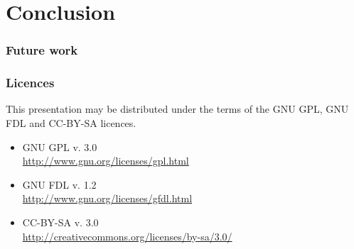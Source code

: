 \documentclass[notes=hide]{beamer}
\begin{document}
\section{Conclusion}
\begin{frame}\frametitle{Future work}
\end{frame}

\begin{frame}\frametitle{Licences}
  This presentation may be distributed under the terms of the
  GNU GPL, GNU FDL and CC-BY-SA licences.
  \begin{itemize}
  \item GNU GPL v. 3.0 \\
    \href{http://www.gnu.org/licenses/gpl.html}{http://www.gnu.org/licenses/gpl.html}
  \item GNU FDL v. 1.2 \\
    \href{http://www.gnu.org/licenses/gfdl.html}{http://www.gnu.org/licenses/gfdl.html}
  \item CC-BY-SA v. 3.0 \\
    \href{http://creativecommons.org/licenses/by-sa/3.0/}{http://creativecommons.org/licenses/by-sa/3.0/}
  \end{itemize}
\end{frame}


\end{document}
